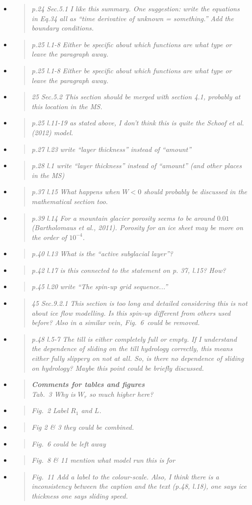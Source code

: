 \documentclass[11pt,reqno]{amsart}
\newcommand{\reply}[2]{
\medskip\medskip
\item  \begin{quote}
\emph{#1}
\end{quote}

\medskip
\noindent #2}
\begin{document}
\begin{itemize}
\reply{p.24 Sec.5.1 I like this summary. One suggestion: write the equations in Eq.34 all as
``time derivative of unknown = something.'' Add the boundary conditions.}
{}

\reply{p.25 l.1-8 Either be specific about which functions are what type or leave the paragraph away.}
{}

\reply{p.25 l.1-8 Either be specific about which functions are what type or leave the paragraph away.}
{}

\reply{25 Sec.5.2 This section should be merged with section 4.1, probably at this location in
the MS.}
{}

\reply{p.25 l.11-19 as stated above, I don’t think this is quite the Schoof et al. (2012) model.}
{}

\reply{p.27 l.23 write ``layer thickness'' instead of ``amount''}
{}

\reply{p.28 l.1 write ``layer thickness'' instead of ``amount'' (and other places in the MS)}
{}

\reply{p.37 l.15 What happens when $W < 0$ should probably be discussed in the mathematical section too.}
{}

\reply{p.39 l.14 For a mountain glacier porosity seems to be around $0.01$ (Bartholomaus
et al., 2011).  Porosity for an ice sheet may be more on the order of $10^{-4}$.}
{}

\reply{p.40 l.13 What is the ``active subglacial layer''?}
{}

\reply{p.42 l.17 is this connected to the statement on p. 37, l.15? How?}
{}

\reply{p.45 l.20 write ``The spin-up grid sequence...''}
{}

\reply{45 Sec.9.2.1 This section is too long and detailed considering this is not about ice flow modelling.  Is this spin-up different from others used before?  Also in a similar
vein, Fig.~6~could be removed.}
{}

\reply{p.48 l.5-7 The till is either completely full or empty.  If I understand the dependence of sliding on the till hydrology correctly, this means either fully slippery on not at all.
So, is there no dependence of sliding on hydrology?  Maybe this point could be
briefly discussed.}
{}

\reply{\textbf{Comments for tables and figures}\\
Tab.~3 Why is $W_r$ so much higher here?}
{}

\reply{Fig.~2 Label $R_1$ and $L$.}
{}

\reply{Fig 2 \& 3 they could be combined.}
{}

\reply{Fig.~6 could be left away}
{}

\reply{Fig.~8 \& 11 mention what model run this is for}
{}

\reply{Fig.~11 Add a label to the colour-scale. Also, I think there is a inconsistency between
the caption and the text (p.48, l.18), one says ice thickness one says sliding
speed.}
{}
\end{itemize}
\end{document}
